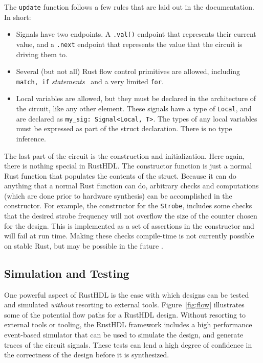 \documentclass[conference]{IEEEtran}
\begin{document}
The \verb|update| function follows a few rules that are laid out in the documentation.  In short:
\begin{itemize}
  \item Signals have two endpoints.  A \verb|.val()| endpoint that represents their current value, and a \verb|.next| endpoint that represents
    the value that the circuit is driving them to.
  \item Several (but not all) Rust flow control primitives are allowed, including \verb|match, if| \emph{statements} \
  and a very limited \verb|for|.  
  \item Local variables are allowed, but they must be declared in the architecture of the circuit, like any other element.
  These signals have a type of \verb|Local|, and are declared as \verb|my_sig: Signal<Local, T>|.  The types of any local 
  variables must be expressed as part of the struct declaration.  There is no type inference.
\end{itemize}

The last part of the circuit is the construction and initialization.  Here again, there is nothing special in RustHDL.  The 
constructor function is just a normal Rust function that populates the contents of the struct.  Because it can do anything
that a normal Rust function can do, arbitrary checks and computations (which are done prior to hardware synthesis) can be 
accomplished in the constructor.  For example, the constructor for the \verb|Strobe|, includes some checks that the 
desired strobe frequency will not overflow the size of the counter chosen for the design.  This is implemented as a set 
of assertions in the constructor and will fail at run time.  Making these checks compile-time is not currently possible on
stable Rust, but may be possible in the future \cite{b11}.

\subsection{Simulation and Testing}

One powerful aspect of RustHDL is the ease with which designs can be tested and simulated \emph{without} 
resorting to external tools.  Figure~\ref{fig:flow} illustrates some of the potential flow paths for a 
RustHDL design.  Without resorting to external tools or tooling, the RustHDL framework includes a high
performance event-based simulator that can be used to simulate the design, and generate traces of the circuit
signals.  These tests can lend a high degree of confidence in the correctness of the design before it is synthesized.
\end{document}
